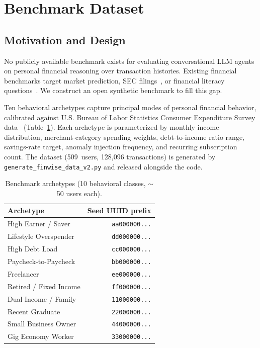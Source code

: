 \documentclass[conference]{IEEEtran}
\begin{document}
\section{Benchmark Dataset}

\subsection{Motivation and Design}

No publicly available benchmark exists for evaluating
conversational LLM agents on personal financial reasoning over
transaction histories. Existing financial benchmarks target market
prediction, SEC filings~\cite{finance_agent_benchmark}, or
financial literacy questions~\cite{hean,flare}. We construct an
open synthetic benchmark to fill this gap.

Ten behavioral archetypes capture principal modes of personal
financial behavior, calibrated against U.S. Bureau of Labor
Statistics Consumer Expenditure Survey data~\cite{bls_cex}
(Table~\ref{tab:archetypes}). Each archetype is parameterized by
monthly income distribution, merchant-category spending weights,
debt-to-income ratio range, savings-rate target, anomaly injection
frequency, and recurring subscription count. The dataset
(509~users, 128{,}096 transactions) is generated by
\texttt{generate\_finwise\_data\_v2.py} and released alongside the
code.

\begin{table}[t]
\centering
\caption{Benchmark archetypes (10 behavioral classes,
$\sim$50 users each).}
\label{tab:archetypes}
\begin{tabular}{@{}lr@{}}
\toprule
Archetype & Seed UUID prefix \\
\midrule
High Earner / Saver & \texttt{aa000000...} \\
Lifestyle Overspender & \texttt{dd000000...} \\
High Debt Load & \texttt{cc000000...} \\
Paycheck-to-Paycheck & \texttt{bb000000...} \\
Freelancer & \texttt{ee000000...} \\
Retired / Fixed Income & \texttt{ff000000...} \\
Dual Income / Family & \texttt{11000000...} \\
Recent Graduate & \texttt{22000000...} \\
Small Business Owner & \texttt{44000000...} \\
Gig Economy Worker & \texttt{33000000...} \\
\bottomrule
\end{tabular}
\end{table}
\end{document}
